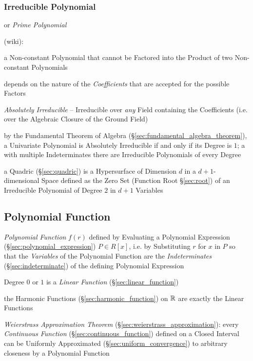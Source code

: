 \subsubsection{Irreducible Polynomial}\label{sec:irreducible_polynomial}

or \emph{Prime Polynomial}

(wiki):

a Non-constant Polynomial that cannot be Factored into the Product of two
Non-constant Polynomials

depends on the nature of the \emph{Coefficients} that are accepted for the
possible Factors

\emph{Absolutely Irreducible} -- Irreducible over \emph{any} Field containing
the Coefficients (i.e. over the Algebraic Closure of the Ground Field)

by the Fundamental Theorem of Algebra
(\S\ref{sec:fundamental_algebra_theorem}), a Univariate Polynomial is Absolutely
Irreducible if and only if its Degree is $1$; a with multiple Indeterminates
there are Irreducible Polynomials of every Degree

\fist a Quadric (\S\ref{sec:quadric}) is a Hypersurface of Dimension $d$ in a
$d+1$-dimensional Space defined as the Zero Set (Function Root
\S\ref{sec:root}) of an Irreducible Polynomial of Degree $2$ in $d+1$
Variables



\subsection{Polynomial Function}\label{sec:polynomial_function}

\emph{Polynomial Function} $f(r)$ defined by Evaluating a Polynomial Expression
(\S\ref{sec:polynomial_expression}) $P \in R[x]$, i.e. by Substituting $r$ for
$x$ in $P$ so that the \emph{Variables} of the Polynomial Function are the
\emph{Indeterminates} (\S\ref{sec:indeterminate}) of the defining Polynomial
Expression

Degree $0$ or $1$ is a \emph{Linear Function} (\S\ref{sec:linear_function})

the Harmonic Functions (\S\ref{sec:harmonic_function}) on $\mathbb{R}$ are
exactly the Linear Functions

\emph{Weierstrass Approximation Theorem}
(\S\ref{sec:weierstrass_approximation}): every \emph{Continuous Function}
(\S\ref{sec:continuous_function}) defined on a Closed Interval can be Uniformly
Approximated (\S\ref{sec:uniform_convergence}) to arbitrary closeness by a
Polynomial Function

